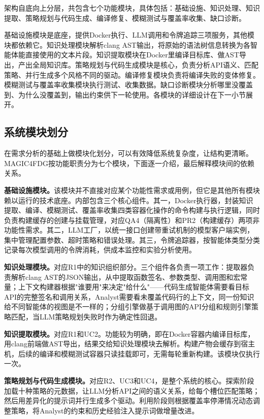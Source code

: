 架构自底向上分层，共包含七个功能模块，具体包括：基础设施、知识处理、知识提取、策略规划与代码生成、编译修复、模糊测试与覆盖率收集、缺口诊断。

基础设施模块是底座，提供Docker执行、LLM调用和令牌追踪三项服务，其他模块都依赖它。知识处理模块解析clang AST输出，将原始的语法树信息转换为各智能体能直接使用的文本片段。知识提取模块在Docker里编译目标库、做AST导出，产出全局知识库。策略规划与代码生成模块是核心，负责分析API语义、匹配策略、并行生成多个风格不同的驱动。编译修复模块负责将编译失败的变体修复。模糊测试与覆盖率收集模块执行测试、收集数据。缺口诊断模块分析哪里没覆盖到、为什么没覆盖到，输出约束供下一轮使用。各模块的详细设计在下一小节展开。

\subsection{系统模块划分}

在需求分析的基础上做模块化划分，可以有效降低系统复杂度，让结构更清晰。MAGIC4FDG按功能职责分为七个模块，下面逐一介绍，最后解释模块间的依赖关系。

\textbf{基础设施模块。}该模块并不直接对应某个功能性需求或用例，但它是其他所有模块赖以运行的技术底座。内部包含三个核心组件。其一，Docker执行器，封装知识提取、编译、模糊测试、覆盖率收集四类容器化操作的命令构建与执行逻辑，同时负责构建缓存的创建与挂载管理，对应QA4（隔离性）和PR2（构建缓存）两项非功能性需求。其二，LLM工厂，以统一接口创建带重试机制的模型客户端实例，集中管理配置参数、超时策略和错误处理。其三，令牌追踪器，按智能体类型分类记录每次模型调用的令牌消耗，供成本监控和实验分析使用。

\textbf{知识处理模块。}对应R1中的知识组织部分。三个组件各负责一项工作：提取器负责解析clang AST的JSON输出，从中提取函数签名、参数类型、调用图和宏常量；上下文构建器根据"谁要用"来决定"给什么"——代码生成智能体需要看目标API的完整签名和调用关系，Analyst需要看未覆盖代码行的上下文，同一份知识给不同智能体的视图是不一样的；分组引擎做基于调用图的API分组和规则引擎策略匹配，当LLM策略规划失败时作为确定性回退。

\textbf{知识提取模块。}对应R1和UC2。功能较为明确，即在Docker容器内编译目标库，用clang前端做AST导出，结果交给知识处理模块去解析。构建产物会缓存到宿主机，后续的编译和模糊测试容器只读挂载即可，无需每轮重新构建。该模块仅执行一次。

\textbf{策略规划与代码生成模块。}对应R2、UC3和UC4，是整个系统的核心。探索阶段加载十种策略的元数据，让LLM分析API之间的语义关系，给每个槽位匹配策略；然后用差异化的提示词并行生成多个驱动。利用阶段则根据覆盖率停滞情况动态调整策略，将Analyst的约束和历史经验注入提示词做增量改进。

